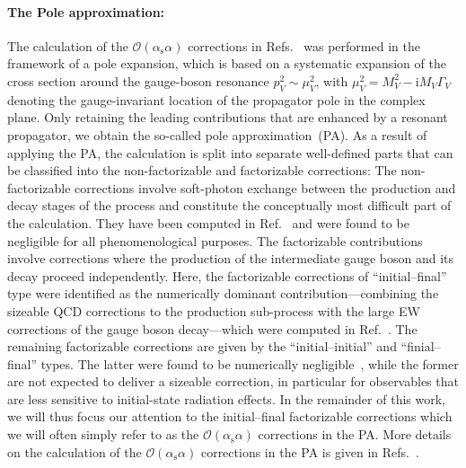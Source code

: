 \documentclass[11pt]{cernrep}
\newcommand{\order}{\ensuremath{\mathcal{O}}}
\newcommand{\alphas}{\ensuremath{\alpha_\mathrm{s}}}
\newcommand{\ri}{\ensuremath{\mathrm{i}}} %
\begin{document}
\paragraph{The Pole approximation:}
The calculation of the $\order(\alphas\alpha)$ corrections in Refs.~\cite{Dittmaier:2014qza,Dittmaier:2015rxo} was performed in the framework of a pole expansion, which is based on a systematic expansion of the cross section around the gauge-boson resonance $p_V^2\sim\mu_V^2$, with $\mu_V^2=M_V^2-\ri M_V\Gamma_V$ denoting the gauge-invariant location of the propagator pole in the complex plane. 
Only retaining the leading contributions that are enhanced by a resonant propagator, we obtain the so-called pole approximation~(PA).
As a result of applying the PA, the calculation is split into separate well-defined parts that can be classified into the non-factorizable and factorizable corrections: 
The non-factorizable corrections involve soft-photon exchange between the production and decay stages of the process and constitute the conceptually most difficult part of the calculation.
They have been computed in Ref.~\cite{Dittmaier:2014qza} and were found to be negligible for all phenomenological purposes.
The factorizable contributions involve corrections where the production of the intermediate gauge boson and its decay proceed independently. 
Here, the factorizable corrections of ``initial--final'' type were identified as the numerically dominant contribution---combining the sizeable QCD corrections to the production sub-process with the large EW corrections of the gauge boson decay---which were computed in Ref.~\cite{Dittmaier:2015rxo}.
The remaining factorizable corrections are given by the ``initial--initial'' and ``finial--final'' types.
The latter were found to be numerically negligible~\cite{Dittmaier:2015rxo}, while the former are not expected to deliver a sizeable correction, in particular for observables that are less sensitive to initial-state radiation effects.
In the remainder of this work, we will thus focus our attention to the initial--final factorizable corrections which we will often simply refer to as the $\order(\alphas\alpha)$ corrections in the PA.
More details on the calculation of the $\order(\alphas\alpha)$ corrections in the PA is given in Refs.~\cite{Dittmaier:2014qza,Dittmaier:2015rxo}.

\end{document}
